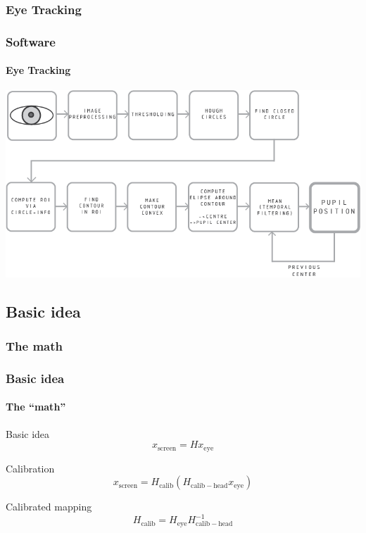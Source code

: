 \documentclass[%
14pt
]{beamer}
\begin{document}
\subsubsection{Eye Tracking}
\begin{frame}
	\frametitle{Software}
  \framesubtitle{Eye Tracking}
  \vspace*{-0.5cm}
  \begin{center}
    \includegraphics[width=1.05\textwidth]{02.png}
  \end{center}
\end{frame}



\subsection{Basic idea}
\subsubsection{The math}
\begin{frame}
	\frametitle{Basic idea}
  \framesubtitle{The ``math''}
  \begin{block}{Basic idea}
    \begin{equation*}
      x_\mathrm{screen} = H x_\mathrm{eye}
    \end{equation*}
  \end{block}\pause
  \begin{block}{Calibration}
    \begin{equation*}
      x_\mathrm{screen} = H_\mathrm{calib} (H_\mathrm{calib-head} x_\mathrm{eye})
    \end{equation*}
  \end{block}\pause
  \begin{block}{Calibrated mapping}
    \begin{equation*}
      H_\mathrm{calib} = H_\mathrm{eye} H_\mathrm{calib-head} ^{-1}
    \end{equation*}
  \end{block}
\end{frame}
\end{document}
